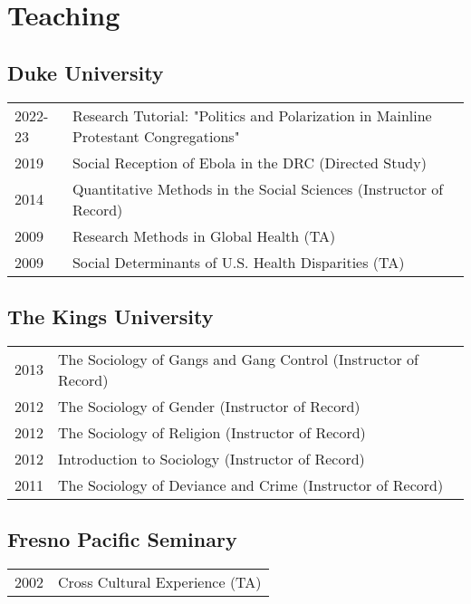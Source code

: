 \section*{Teaching}
\subsection*{Duke University}

\begin{tabular}{p{} p{}}
2022-23 & Research Tutorial: "Politics and Polarization in Mainline Protestant Congregations" \\
2019 & Social Reception of Ebola in the DRC (Directed Study) \\
2014 & Quantitative Methods in the Social Sciences (Instructor of Record)\\
2009 & Research Methods in Global Health (TA) \\
2009 & Social Determinants of U.S. Health Disparities (TA)\\
\end{tabular}

\subsection*{The Kings University}

\begin{tabular}{p{} p{}}
2013 & The Sociology of Gangs and Gang Control (Instructor of Record)\\
2012 & The Sociology of Gender (Instructor of Record)\\
2012 & The Sociology of Religion (Instructor of Record)\\
2012 & Introduction to Sociology (Instructor of Record)\\
2011 & The Sociology of Deviance and Crime (Instructor of Record)\\
\end{tabular}

\subsection*{Fresno Pacific Seminary}

\begin{tabular}{p{} p{}}
2002 & Cross Cultural Experience (TA) \\
\end{tabular}
\vspace{-1em}